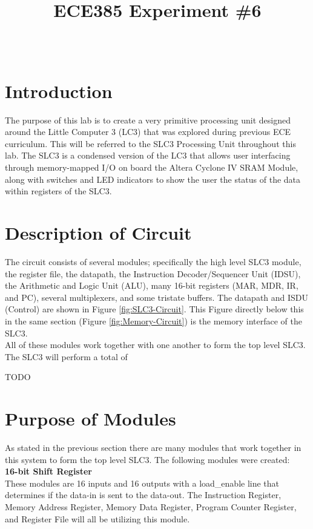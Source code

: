 \documentclass[journal, twocolumn, final,11pt,letterpaper]{IEEEtran}
\title{ECE385 Experiment \#6
	}
\author{
\IEEEauthorblockN{Eric Meyers, Ryan Helsdingen}\\
\IEEEauthorblockA{Section ABG; TAs: Ben Delay, Shuo Liu \\
March 9th, 2016 \\
emeyer7, helsdin2}}
\begin{document}
	
\maketitle
\singlespacing

\section{Introduction}
The purpose of this lab is to create a very primitive processing unit designed around the Little Computer 3 (LC3) that was explored during previous ECE curriculum. This will be referred to the SLC3 Processing Unit throughout this lab. The SLC3 is a condensed version of the LC3 that allows user interfacing through memory-mapped I/O on board the Altera Cyclone IV SRAM Module, along with switches and LED indicators to show the user the status of the data within registers of the SLC3.  

\section{Description of Circuit}
The circuit consists of several modules; specifically the high level SLC­3 module, the register file, the datapath, the Instruction Decoder/Sequencer Unit (IDSU), the Arithmetic and Logic Unit (ALU), many 16-bit registers (MAR, MDR, IR, and PC), several multiplexers, and some tristate buffers. The datapath and ISDU (Control) are shown in Figure \ref{fig:SLC3-Circuit}. This Figure directly below this in the same section (Figure \ref{fig:Memory-Circuit}) is the memory interface of the SLC3.\\

All of these modules work together with one another to form the top level SLC3. The SLC3 will perform a total of 

TODO

\section{Purpose of Modules}
As stated in the previous section there are many modules that work together in this system to form the top level SLC3. The following modules were created:\\

\normalsize\textbf{16-bit Shift Register} \\
These modules are 16 inputs and 16 outputs with a load\_enable line that determines if the data-in is sent to the data-out. The Instruction Register, Memory Address Register, Memory Data Register, Program Counter Register, and Register File will all be utilizing this module. \\
\end{document}
